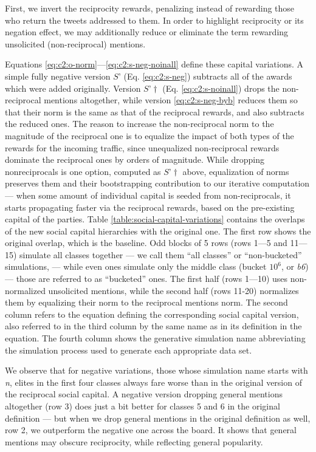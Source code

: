 \documentclass[10pt,oneside]{memoir}
\begin{document}
\begin{Spacing}{2}
First, we invert the reciprocity rewards, penalizing instead of rewarding those who return the tweets addressed to them.  In order to highlight reciprocity or its negation  effect, we may additionally reduce or eliminate the term rewarding unsolicited (non-reciprocal) mentions.



Equations \ref{eq:c2:o-norm}—\ref{eq:c2:s-neg-noinall} define these capital variations.  A simple fully negative version $S’$ (Eq. \ref{eq:c2:s-neg}) subtracts all of the awards which were added originally.  Version $S’\dagger$ (Eq. \ref{eq:c2:s-noinall}) drops the non-reciprocal mentions altogether, while version \ref{eq:c2:s-neg-byb} reduces them so that their norm is the same as that of the reciprocal rewards, and also subtracts the reduced ones.  The reason to increase the non-reciprocal norm to the magnitude of the reciprocal one is to equalize the impact of both types of the rewards for the incoming traffic, since unequalized non-reciprocal rewards dominate the reciprocal ones by orders of magnitude.  While dropping nonreciprocals is one option, computed as $S’\dagger$ above, equalization of norms preserves them and their bootstrapping contribution to our iterative computation — when some amount of individual capital is seeded from non-reciprocals, it starts propagating faster via the reciprocal rewards, based on the pre-existing capital of the parties.
Table \ref{table:social-capital-variations} contains the overlaps of the new social capital hierarchies with the original one.  The first row shows the original overlap, which is the baseline.  Odd blocks of 5 rows (rows 1---5 and 11---15) simulate all classes together --- we call them ``all classes'' or ``non-bucketed'' simulations, --- while even ones simulate only the middle class (bucket $10^6$, or \emph{b6}) --- those are referred to as ``bucketed'' ones.  The first half (rows 1---10) uses non-normalized unsolicited mentions, while the second half (rows 11-20) normalizes them by equalizing their norm to the reciprocal mentions norm.  The second column refers to the equation defining the corresponding social capital version, also referred to in the third column by the same name as in its definition in the equation.  The fourth column shows the generative simulation name abbreviating the simulation process used to generate each appropriate data set.


We observe that for negative variations, those whose simulation name starts with \emph{n}, elites in the first four classes always fare worse than in the original version of the reciprocal social capital.  A negative version dropping general mentions altogether (row 3) does just a bit better for classes 5 and 6 in the original definition --- but when we drop general mentions in the original definition as well, row 2, we outperform the negative one across the board.  It shows that general mentions may obscure reciprocity, while reflecting general popularity.



\end{Spacing}
\end{document}
